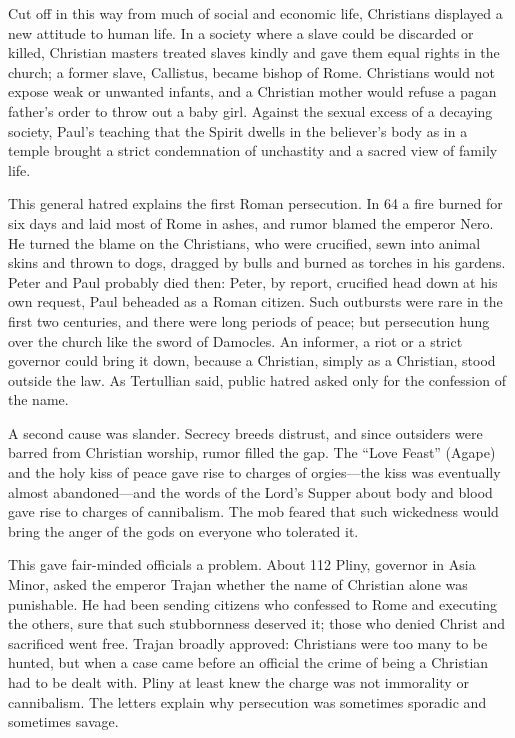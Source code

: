 Cut off in this way from much of social and economic life, Christians displayed a new attitude to human
life. In a society where a slave could be discarded or killed, Christian masters treated slaves kindly
and gave them equal rights in the church; a former slave, Callistus, became bishop of Rome. Christians
would not expose weak or unwanted infants, and a Christian mother would refuse a pagan father's order
to throw out a baby girl. Against the sexual excess of a decaying society, Paul's teaching that the Spirit dwells in the believer's body as in a temple brought a strict condemnation of unchastity and a sacred view of
family life.

This general hatred explains the first Roman persecution. In 64 a fire burned for six days and laid
most of Rome in ashes, and rumor blamed the emperor Nero. He turned the blame on the Christians, who
were crucified, sewn into animal skins and thrown to dogs, dragged by bulls and burned as torches in
his gardens. Peter and Paul probably died then: Peter, by report, crucified head down at his own
request, Paul beheaded as a Roman citizen. Such outbursts were rare in the first two centuries, and
there were long periods of peace; but persecution hung over the church like the sword of Damocles. An
informer, a riot or a strict governor could bring it down, because a Christian, simply as a Christian, stood outside the law. As Tertullian said, public hatred asked only for the confession of the name.

A second cause was slander. Secrecy breeds distrust, and since outsiders were barred from Christian
worship, rumor filled the gap. The ``Love Feast'' (Agape) and the holy kiss of peace gave rise to
charges of orgies---the kiss was eventually almost abandoned---and the words of the Lord's Supper
about body and blood gave rise to charges of cannibalism. The mob feared that such wickedness would
bring the anger of the gods on everyone who tolerated it.

This gave fair-minded officials a problem. About 112 Pliny, governor in Asia Minor, asked the emperor
Trajan whether the name of Christian alone was punishable. He had been sending citizens who confessed
to Rome and executing the others, sure that such stubbornness deserved it; those who denied Christ and
sacrificed went free. Trajan broadly approved: Christians were too many to be hunted, but when a case
came before an official the crime of being a Christian had to be dealt with. Pliny at least knew the
charge was not immorality or cannibalism. The letters explain why persecution was sometimes sporadic
and sometimes savage.

